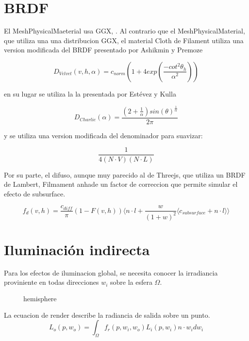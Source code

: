 \section{BRDF}
El MeshPhysicalMaeterial usa GGX, \autocite{ggx}.
Al contrario que el MeshPhysicalMaterial, que utiliza una una distribucion GGX, el material
Cloth de Filament utiliza una  version modificada del BRDF presentado por Ashikmin y Premoze
\autocite{velvet}

\begin{equation}
D_{Velvet}(v, h, \alpha) = c_{norm} (
	1 + 4exp \left(\frac{-cot^2\theta_h}{\alpha^2}\right)
)
\end{equation}

en su lugar se utiliza la la presentada por Est\'evez y Kulla \autocite{sheen}

\begin{equation}
  D_{Charlie}(\alpha) = \frac
    {(2 + \frac{1}{\alpha})sin(\theta)^\frac{1}{\alpha}}
    {2\pi}
\end{equation}

y se utiliza una version modificada del denominador para suavizar:

\begin{equation}
\frac{1}{4(N\cdot{V})(N\cdot{L})}
\end{equation}

Por su parte, el difuso, aunque muy parecido al de Threejs, que utiliza un BRDF de Lambert,
Filmament anhade un factor de correccion que permite simular el efecto de subsurface.

\begin{equation}
f_d(v, h) = \frac{c_{diff}}{\pi}(1 - F(v, h))
\Bigg\langle
n\cdot{l} + \frac{w}{(1+ w)^2}\langle c_{subsurface} + n \cdot{l} \rangle
\Bigg\rangle
\end{equation}

\section{Iluminaci\'on indirecta}
Para los efectos de iluminacion global, se necesita conocer la irradiancia proviniente en todas
direcciones $w_i$ sobre la esfera $\Omega$.

\begin{figure}[H]
  \vspace{0.5cm}
  \centering
  \caption{hemisphere}
\end{figure}

La ecuacion de render describe la radiancia de salida sobre un punto.
\begin{equation}
L_o(p, w_o) = \int_{\Omega} f_r(p, w_i, w_o)L_i(p, w_i)n\cdot{w_i}dw_i
\end{equation}

